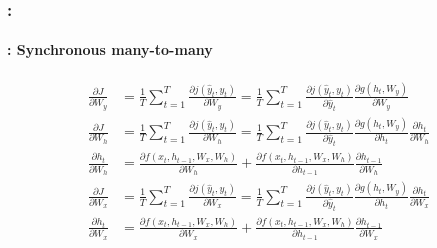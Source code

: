 \documentclass[xcolor=table]{beamer}
\begin{document}
\begin{frame}
	\frametitle{\insertshortsubtitle: \insertsection}
	\framesubtitle{\insertsubsection: Synchronous many-to-many}
	
	\begin{align*}
		\frac{\partial J}{\partial W_y} & =
		\frac{1}{T} \sum_{t=1}^{T} \frac{\partial j(\hat{y}_t, y_t)}{\partial W_y}
		= \frac{1}{T} \sum_{t=1}^{T} \frac{\partial j(\hat{y}_t, y_t)}{\partial \hat{y}_t} 
		\frac{\partial g(h_t, W_y)}{\partial W_y} \\
		\frac{\partial J}{\partial W_h} & = \frac{1}{T} \sum_{t=1}^{T} \frac{\partial j(\hat{y}_t, y_t)}{\partial W_h}
		= \frac{1}{T} \sum_{t=1}^{T} \frac{\partial j(\hat{y}_t, y_t)}{\partial \hat{y}_t} 
		\frac{\partial g(h_t, W_y)}{\partial h_t} 
		\frac{\partial h_t}{\partial W_h} \\
		\frac{\partial h_t}{\partial W_h} & = 
		\frac{\partial f(x_t, h_{t-1}, W_x, W_h)}{\partial W_h} + 
		\frac{\partial f(x_t, h_{t-1}, W_x, W_h)}{\partial h_{t-1}} \frac{\partial h_{t-1}}{\partial W_h} \\
		\frac{\partial J}{\partial W_x} & = 
		\frac{1}{T} \sum_{t=1}^{T} \frac{\partial j(\hat{y}_t, y_t)}{\partial W_x}
		= \frac{1}{T} \sum_{t=1}^{T} \frac{\partial j(\hat{y}_t, y_t)}{\partial \hat{y}_t} 
		\frac{\partial g(h_t, W_y)}{\partial h_t} 
		\frac{\partial h_t}{\partial W_x} \\
		\frac{\partial h_t}{\partial W_x} & = 
		\frac{\partial f(x_t, h_{t-1}, W_x, W_h)}{\partial W_x} + 
		\frac{\partial f(x_t, h_{t-1}, W_x, W_h)}{\partial h_{t-1}} \frac{\partial h_{t-1}}{\partial W_x} \\
	\end{align*}
	
\end{frame}
\end{document}
